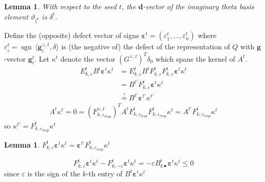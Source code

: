 \documentclass{amsart}
\newtheorem{lemma}[theorem]{Lemma}
\numberwithin{theorem}{section}
\newcommand{\bfd}{\boldsymbol{d}}
\newcommand{\bfg}{\boldsymbol{g}}
\newcommand{\sgn}{{\operatorname{sgn}}}
\begin{document}
  \begin{lemma}
    With respect to the seed $t$, the $\bfd$-vector of the imaginary theta basis element $\vartheta_{\zeta^t}$ is $\delta^t$. 
  \end{lemma}

  Define the (opposite) defect vector of signs $\boldsymbol{\varepsilon}^t=(\varepsilon^t_1,\ldots,\varepsilon^t_n)$ where $\varepsilon^t_i=\sgn\,\langle \bfg^{\vee,t}_i,\delta\rangle$ is (the negative of) the defect of the representation of $Q$ with $\bfg$-vector $\bfg^t_i$.
  Let $\kappa^t$ denote the vector $(G^{\vee,t})^T\delta_0$ which spans the kernel of $A^t$.
  \begin{align*}
    E_{k,\varepsilon}^t B^t \boldsymbol{\varepsilon}^t \kappa^t
    &=
    E_{k,\varepsilon}^t B^t F^t_{k,\varepsilon} F^t_{k,\varepsilon} \boldsymbol{\varepsilon}^t \kappa^t\\
    &=
    B^{t'} F^t_{k,\varepsilon} \boldsymbol{\varepsilon}^t \kappa^t\\
    &\stackrel{?}{=} B^{t'} \boldsymbol{\varepsilon}^{t'} \kappa^{t'}
  \end{align*}
  \begin{align*}
    A^t\kappa^t=0=(F^{\vee,t}_{k,\varepsilon_{trop}})^T A^t F^t_{k,\varepsilon_{trop}} F^t_{k,\varepsilon_{trop}} \kappa^t=A^{t'} F^t_{k,\varepsilon_{trop}} \kappa^t
  \end{align*}
  so $\kappa^{t'}=F^t_{k,\varepsilon_{trop}} \kappa^t$

  \begin{lemma}
    $F^t_{k,\varepsilon} \boldsymbol{\varepsilon}^t \kappa^t = \boldsymbol{\varepsilon}^{t'} F^t_{k,\varepsilon_{trop}} \kappa^t$
  \end{lemma}
  \[F^t_{k,\varepsilon} \boldsymbol{\varepsilon}^t \kappa^t - F^t_{k,-\varepsilon} \boldsymbol{\varepsilon}^t \kappa^t=-\varepsilon B^t_{k\bullet} \boldsymbol{\varepsilon}^t \kappa^t \le 0\]
  since $\varepsilon$ is the sign of the $k$-th entry of $B^t \boldsymbol{\varepsilon}^t \kappa^t$



  
\end{document}
